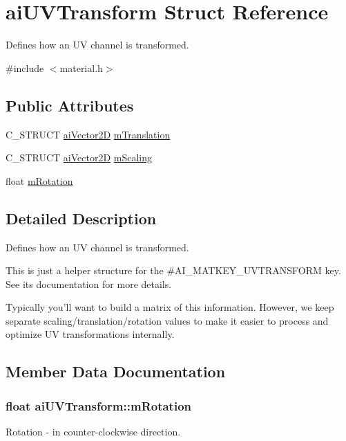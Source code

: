 \hypertarget{structaiUVTransform}{\section{ai\-U\-V\-Transform \-Struct \-Reference}
\label{structaiUVTransform}
}


\-Defines how an \-U\-V channel is transformed.  




{\ttfamily \#include $<$material.\-h$>$}

\subsection*{\-Public \-Attributes}
\begin{DoxyCompactItemize}
\item 
\-C\-\_\-\-S\-T\-R\-U\-C\-T \hyperlink{structaiVector2D}{ai\-Vector2\-D} \hyperlink{structaiUVTransform_a8c7f35959aa342bf0cef670246fbb813}{m\-Translation}
\item 
\-C\-\_\-\-S\-T\-R\-U\-C\-T \hyperlink{structaiVector2D}{ai\-Vector2\-D} \hyperlink{structaiUVTransform_a89429a027cbf914e7212e48149a957c8}{m\-Scaling}
\item 
float \hyperlink{structaiUVTransform_aa8dcf39ccd39f786b3f5f163bd663792}{m\-Rotation}
\end{DoxyCompactItemize}


\subsection{\-Detailed \-Description}
\-Defines how an \-U\-V channel is transformed. 

\-This is just a helper structure for the \#\-A\-I\-\_\-\-M\-A\-T\-K\-E\-Y\-\_\-\-U\-V\-T\-R\-A\-N\-S\-F\-O\-R\-M key. \-See its documentation for more details.

\-Typically you'll want to build a matrix of this information. \-However, we keep separate scaling/translation/rotation values to make it easier to process and optimize \-U\-V transformations internally. 

\subsection{\-Member \-Data \-Documentation}
\hypertarget{structaiUVTransform_aa8dcf39ccd39f786b3f5f163bd663792}{
\subsubsection[{m\-Rotation}]{\setlength{\rightskip}{0pt plus 5cm}float {\bf ai\-U\-V\-Transform\-::m\-Rotation}}}\label{structaiUVTransform_aa8dcf39ccd39f786b3f5f163bd663792}
\-Rotation -\/ in counter-\/clockwise direction.

